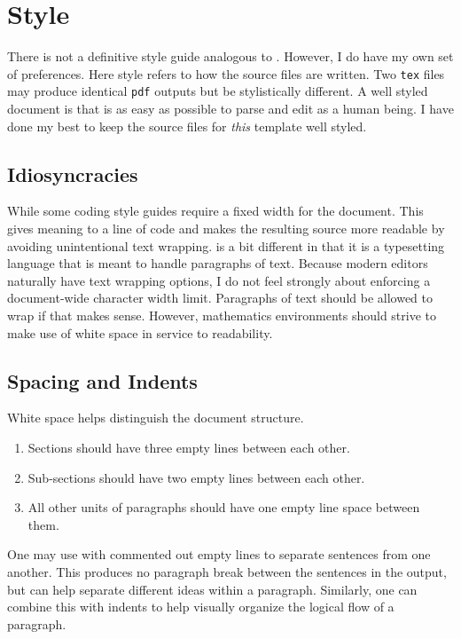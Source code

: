 
\section{\texorpdfstring{\LaTeXx Style}{LaTeX Style}}

There is not a definitive \LaTeXx style guide analogous to . However, I do have my own set of preferences. Here style refers to how the \LaTeXx source files are written. Two \texttt{tex} files may produce identical \texttt{pdf} outputs but be stylistically different. A well styled document is that is as easy as possible to parse and edit as a human being. I have done my best to keep the source files for \emph{this} template well styled.


\subsection{Idiosyncracies}

While some coding style guides require a fixed width for the document. This gives meaning to a line of code and makes the resulting source more readable by avoiding unintentional text wrapping. \LaTeXx is a bit different in that it is a typesetting language that is meant to handle paragraphs of text. Because modern editors naturally have text wrapping options, I do not feel strongly about enforcing a document-wide character width limit. Paragraphs of text should be allowed to wrap if that makes sense. However, mathematics environments should strive to make use of white space in service to readability.


\subsection{Spacing and Indents}

White space helps distinguish the document structure. 

\begin{enumerate}
	\item Sections should have three empty lines between each other.
	\item Sub-sections should have two empty lines between each other.
	\item All other units of paragraphs should have one empty line space between them.
\end{enumerate}
One may use with commented out empty lines to separate sentences from one another. 
% 
	This produces no paragraph break between the sentences in the output, but can help separate different ideas within a paragraph.
% 
	Similarly, one can combine this with indents to help visually organize the logical flow of a paragraph.


